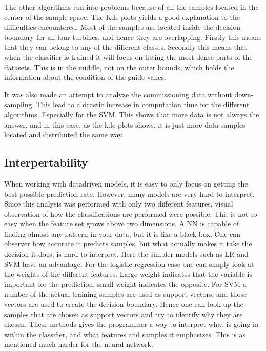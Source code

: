             The other algorithms run into problems because of all the samples located in the center of the sample space. The Kde plots yields a good explanation to the difficulties encountered. Most of the samples are located inside the decision boundary for all four turbines, and hence they are overlapping. Firstly this means that they can belong to any of the different classes. Secondly this means that when the classifier is trained it will focus on fitting the most dense parts of the datasets. This is in the middle, not on the outer bounds, which holds the information about the condition of the guide vanes.  
            
            It was also made an attempt to analyze the commissioning data without down-sampling. This lead to a drastic increase in computation time for the different algorithms. Especially for the SVM. This shows that more data is not always the answer, and in this case, as the kde plots shows, it is just more data samples located and distributed the same way. 

        
        
        
        
    
    
    \subsection{Interpertability}
        When working with datadriven models, it is easy to only focus on getting the best possible prediction rate. However, many models are very hard to interpret. Since this analysis was performed with only two different features, visual observation of how the classifications are performed were possible. This is not so easy when the feature set grows above two dimensions. A NN is capable of finding almost any pattern in your data, but it is like a black box. One can observer how accurate it predicts samples, but what actually makes it take the decision it does, is hard to interpret. Here the simpler models such as LR and SVM have an advantage. For the logistic regression case one can simply look at the weights of the different features. Large weight indicates that the variable is important for the prediction, small weight indicates the opposite. For SVM a number of the actual training samples are used as support vectors, and those vectors are used to create the decision boundary. Hence one can look up the samples that are chosen as support vectors and try to identify why they are chosen. These methods gives the programmer a way to interpret what is going in within the classifier, and what features and samples it emphasizes. This is as mentioned much harder for the neural network.
    
